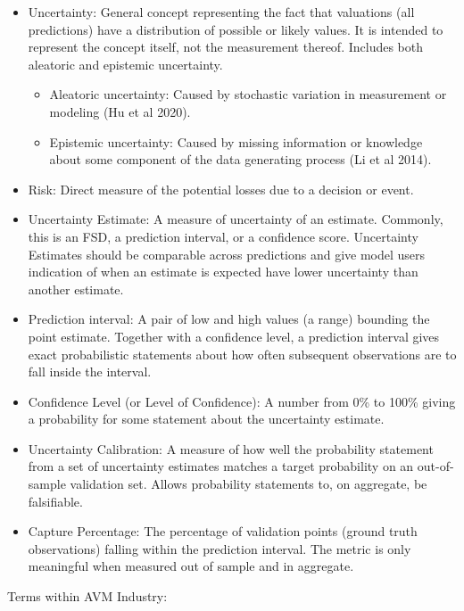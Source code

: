 \documentclass[colTwo]{format}
\theoremstyle{definition}
\begin{document}
\begin{itemize}
\item Uncertainty: General concept representing the fact that valuations (all predictions) have a distribution of possible or likely values.  It is intended to represent the concept itself, not the measurement thereof. Includes both aleatoric and epistemic uncertainty.
  \begin{itemize}
    \item Aleatoric uncertainty: Caused by stochastic variation in measurement or modeling (Hu et al 2020).
    \item Epistemic uncertainty: Caused by missing information or knowledge about some component of the data generating process (Li et al 2014).
  \end{itemize}
\item Risk: Direct measure of the potential losses due to a decision or event.
\item Uncertainty Estimate: A measure of uncertainty of an estimate. Commonly, this is an FSD, a prediction interval, or a confidence score. Uncertainty Estimates should be comparable across predictions and give model users indication of when an estimate is expected have lower uncertainty than another estimate.
\item Prediction interval: A pair of low and high values (a range) bounding the point estimate. Together with a confidence level, a prediction interval gives exact probabilistic statements about how often subsequent observations are to fall inside the interval.
\item Confidence Level (or Level of Confidence): A number from 0\% to 100\% giving a probability for some statement about the uncertainty estimate.
\item Uncertainty Calibration: A measure of how well the probability statement from a set of uncertainty estimates matches a target probability on an out-of-sample validation set. Allows probability statements to, on aggregate, be falsifiable.
\item Capture Percentage: The percentage of validation points (ground truth observations) falling within the prediction interval. The metric is only meaningful when measured out of sample and in aggregate. 
\end{itemize}

Terms within AVM Industry:
\end{document}
